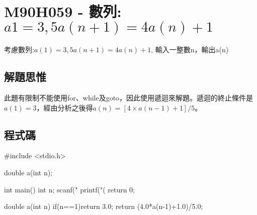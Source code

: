 \section{M90H059 - 數列:$a1=3, 5a(n+1)=4a(n)+1$}
考慮數列:$a(1)=3, 5a(n+1)=4a(n)+1$, 
輸入一整數n，輸出a(n) 
\subsection{解題思惟}
此題有限制不能使用for、while及goto，因此使用遞迴來解題。遞迴的終止條件是$a(1)=3$，經由分析之後得$a(n)=[4\times a(n-1)+1]/5$。
\subsection{程式碼}
\begin{cppcode}
	#include <stdio.h>
	
	double a(int n);
	
	int main()
	{
		int n;
		scanf("%
		printf("\na(%
		return 0;
	}
	
	double a(int n)
	{
		if(n==1)return 3.0;
		return (4.0*a(n-1)+1.0)/5.0;
	}
\end{cppcode}
